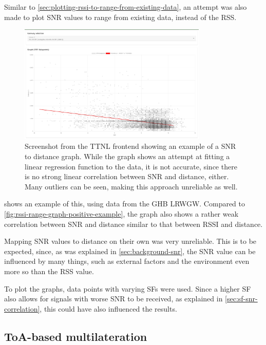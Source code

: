 Similar to \cref{sec:plotting-rssi-to-range-from-existing-data}, an attempt was also made to plot \ac{SNR} values to range from existing data, instead of the \ac{RSS}.

\begin{figure}[htbp]
    \centering
    \includegraphics[width=0.8\textwidth]{pictures/ttn-locator/frontend/data/gateway_ghb_snr_range_graph.jpg}
    \caption{
        Screenshot from the \ac{TTNL} frontend showing an example of a \acf{SNR} to distance graph.
        While the graph shows an attempt at fitting a linear regression function to the data, it is not accurate, since there is no strong linear correlation between \ac{SNR} and distance, either.
        Many outliers can be seen, making this approach unreliable as well.
    }\label{fig:snr-range-graph-example}
\end{figure}

 shows an example of this, using data from the \ac{GHB} \acl{LRWGW}.
Compared to \cref{fig:rssi-range-graph-positive-example}, the graph also shows a rather weak correlation between \ac{SNR} and distance similar to that between \ac{RSSI} and distance.

Mapping \ac{SNR} values to distance on their own was very unreliable.
This is to be expected, since, as was explained in \cref{sec:background-snr}, the \ac{SNR} value can be influenced by many things, such as external factors and the environment even more so than the \ac{RSS} value.

To plot the graphs, data points with varying \acp{SF} were used.
Since a higher \ac{SF} also allows for signals with worse \ac{SNR} to be received, as explained in \cref{sec:sf-snr-correlation}, this could have also influenced the results.

\subsection{\acf{ToA}-based multilateration}\label{subsec:toa-based-multilateration-implementation}

